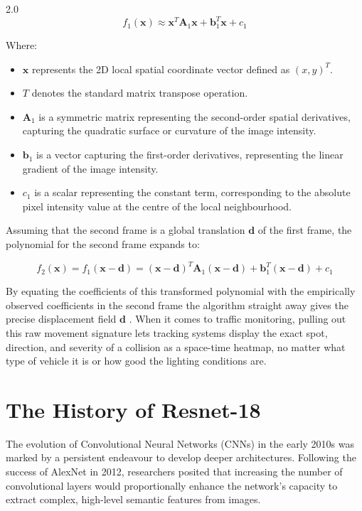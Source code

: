 \begin{spacing}{2.0}
\begin{equation}
f_1(\mathbf{x}) \approx \mathbf{x}^T \mathbf{A}_1 \mathbf{x} + \mathbf{b}_1^T \mathbf{x} + c_1
\label{eq:farneback_poly1}
\end{equation}

Where:
\begin{itemize}
    \item $\mathbf{x}$ represents the 2D local spatial coordinate vector defined as $(x, y)^T$.
    \item $T$ denotes the standard matrix transpose operation.
    \item $\mathbf{A}_1$ is a symmetric matrix representing the second-order spatial derivatives, capturing the quadratic surface or curvature of the image intensity.
    \item $\mathbf{b}_1$ is a vector capturing the first-order derivatives, representing the linear gradient of the image intensity.
    \item $c_1$ is a scalar representing the constant term, corresponding to the absolute pixel intensity value at the centre of the local neighbourhood.
\end{itemize}

Assuming that the second frame is a global translation $\mathbf{d}$ of the first frame, the polynomial for the second frame expands to:

\begin{equation}
f_2(\mathbf{x}) = f_1(\mathbf{x} - \mathbf{d}) = (\mathbf{x} - \mathbf{d})^T \mathbf{A}_1 (\mathbf{x} - \mathbf{d}) + \mathbf{b}_1^T (\mathbf{x} - \mathbf{d}) + c_1
\label{eq:farneback_poly2}
\end{equation}

By equating the coefficients of this transformed polynomial with the empirically observed coefficients in the second frame the algorithm straight away gives the precise displacement field $\mathbf{d}$ \cite{goos_two-frame_2003}. When it comes to traffic monitoring, pulling out this raw movement signature lets tracking systems display the exact spot, direction, and severity of a collision as a space-time heatmap, no matter what type of vehicle it is or how good the lighting conditions are.

\section{The History of Resnet-18}
The evolution of Convolutional Neural Networks (CNNs) in the early 2010s was marked by a persistent endeavour to develop deeper architectures. Following the success of AlexNet in 2012, researchers posited that increasing the number of convolutional layers would proportionally enhance the network's capacity to extract complex, high-level semantic features from images.


\end{spacing}

